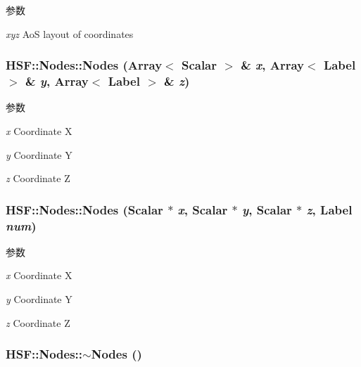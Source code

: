 \begin{DoxyParams}{参数}
\item[{\em xyz}]AoS layout of coordinates \end{DoxyParams}
\hypertarget{classHSF_1_1Nodes_aa08a28dcddd6fdbc64fef3d3c7bfba82}{
\subsubsection[{Nodes}]{\setlength{\rightskip}{0pt plus 5cm}HSF::Nodes::Nodes (Array$<$ {\bf Scalar} $>$ \& {\em x}, \/  Array$<$ {\bf Label} $>$ \& {\em y}, \/  Array$<$ {\bf Label} $>$ \& {\em z})}}
\label{classHSF_1_1Nodes_aa08a28dcddd6fdbc64fef3d3c7bfba82}

\begin{DoxyParams}{参数}
\item[{\em x}]Coordinate X \item[{\em y}]Coordinate Y \item[{\em z}]Coordinate Z \end{DoxyParams}
\hypertarget{classHSF_1_1Nodes_a545e2813acfe02611c3ef8d659c8ce2f}{
\subsubsection[{Nodes}]{\setlength{\rightskip}{0pt plus 5cm}HSF::Nodes::Nodes ({\bf Scalar} $\ast$ {\em x}, \/  {\bf Scalar} $\ast$ {\em y}, \/  {\bf Scalar} $\ast$ {\em z}, \/  {\bf Label} {\em num})}}
\label{classHSF_1_1Nodes_a545e2813acfe02611c3ef8d659c8ce2f}

\begin{DoxyParams}{参数}
\item[{\em x}]Coordinate X \item[{\em y}]Coordinate Y \item[{\em z}]Coordinate Z \end{DoxyParams}
\hypertarget{classHSF_1_1Nodes_aad6cecbfe88532697dedfca221638d89}{
\subsubsection[{$\sim$Nodes}]{\setlength{\rightskip}{0pt plus 5cm}HSF::Nodes::$\sim$Nodes ()}}
\label{classHSF_1_1Nodes_aad6cecbfe88532697dedfca221638d89}


